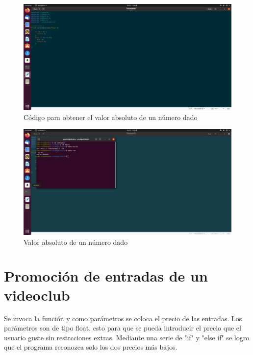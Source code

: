 \documentclass[
  letterpaper, 
  maincolor=black,
  sectioncolor=black!90,
  subsectioncolor=black!70,
  itemtextcolor=black!40,
]{fortysecondscv}
\begin{document}
    
            \begin{figure}[H]
                \centering
                \includegraphics[trim= 0 550 1100 0,clip,width=1.20\textwidth]{img/punto1.png}
                \caption{Código para obtener el valor absoluto de un número dado }
                \label{fig:my_label}
            \end{figure}
            \begin{figure}[H]
                \centering
                \includegraphics[trim= 115 550 950 100,clip,width=1.20\textwidth]{img/punto1-1.png}
                \caption{Valor absoluto de un número dado}                
                \label{fig:my_label}
            \end{figure}
    \newpage
        
    \section{Promoción de entradas de un videoclub}
        Se invoca la función y como parámetros se coloca el precio de las entradas. Los parámetros son de tipo float, esto para que se pueda introducir el precio que el usuario guste sin restrcciones extras. Mediante una serie de "if" y "else if" se logro que el programa reconozca solo los dos precios más bajos.
        
\end{document}
